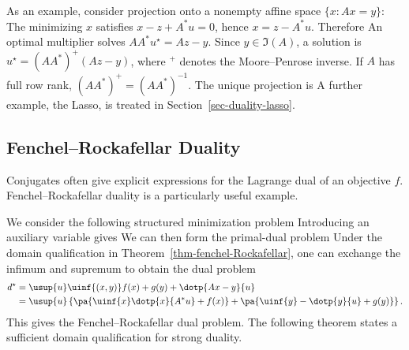 As an example, consider projection onto a nonempty affine space $\{x:Ax=y\}$:
The minimizing $x$ satisfies $x-z+A^*u=0$, hence $x=z-A^*u$. Therefore
An optimal multiplier solves $AA^*u^\star=Az-y$. Since $y\in\Im(A)$, a solution is $u^\star=(AA^*)^+(Az-y)$, where ${}^+$ denotes the Moore--Penrose inverse. If $A$ has full row rank, $(AA^*)^+=(AA^*)^{-1}$. The unique projection is
A further example, the Lasso, is treated in Section~\ref{sec-duality-lasso}.

\subsection{Fenchel--Rockafellar Duality}


Conjugates often give explicit expressions for the Lagrange dual of an objective $f$. Fenchel--Rockafellar duality is a particularly useful example.

We consider the following structured minimization problem
Introducing an auxiliary variable gives
We can then form the primal-dual problem
Under the domain qualification in Theorem~\ref{thm-fenchel-Rockafellar}, one can exchange the infimum and supremum to obtain the dual problem
\begin{align}\label{eq-deriv-rock-fench}
	d^\star &= \usup{u} \uinf{(x,y)} f(x) + g(y) + \dotp{Ax-y}{u} \\
	&= \usup{u} \left\{\pa{ \uinf{x} \dotp{x}{A^* u} + f(x) } + \pa{ \uinf{y} -\dotp{y}{u} + g(y) }\right\}.
\end{align}
This gives the Fenchel--Rockafellar dual problem. The following theorem states a sufficient domain qualification for strong duality.

